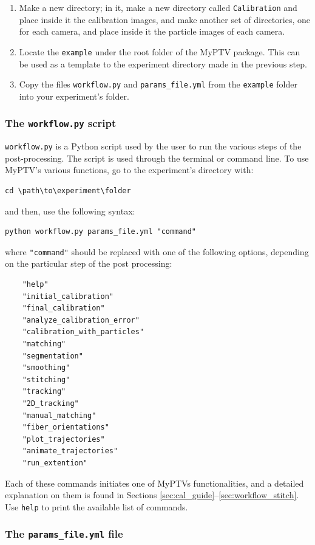\documentclass[10pt,a4paper]{article}
\begin{document}
\begin{enumerate}
	\item Make a new directory; in it, make a new directory called \texttt{Calibration} and place inside it the calibration images, and make another set of directories, one for each camera, and place inside it the particle images of each camera.
	\item Locate the \texttt{example} under the root folder of the MyPTV package. This can be used as a template to the experiment directory made in the previous step.
	\item Copy the files \texttt{workflow.py} and \texttt{params\_file.yml} from the \texttt{example} folder into your experiment's folder.
\end{enumerate}




\subsubsection{The \texttt{workflow.py} script} \label{sec:workflow_commands}

\texttt{workflow.py} is a Python script used by the user to run the various steps of the post-processing. The script is used through the terminal or command line. To use MyPTV's various functions, go to the experiment's directory with:
\begin{verbatim}
cd \path\to\experiment\folder
\end{verbatim}
%
and then, use the following syntax:
%
\begin{verbatim}
python workflow.py params_file.yml "command"
\end{verbatim}
%
where \texttt{"command"} should be replaced with one of the following options, depending on the particular step of the post processing:
%
\begin{verbatim}
	"help"
	"initial_calibration"
	"final_calibration"
	"analyze_calibration_error"
	"calibration_with_particles"
	"matching"
	"segmentation"
	"smoothing"
	"stitching"
	"tracking"
	"2D_tracking"
	"manual_matching"
	"fiber_orientations"
	"plot_trajectories"
	"animate_trajectories"
	"run_extention"
\end{verbatim}
%
Each of these commands initiates one of MyPTVs functionalities, and a detailed explanation on them is found in Sections \ref{sec:cal_guide}--\ref{sec:workflow_stitch}. Use \texttt{help} to print the available list of commands.


\subsubsection{The \texttt{params\_file.yml} file}
\end{document}
